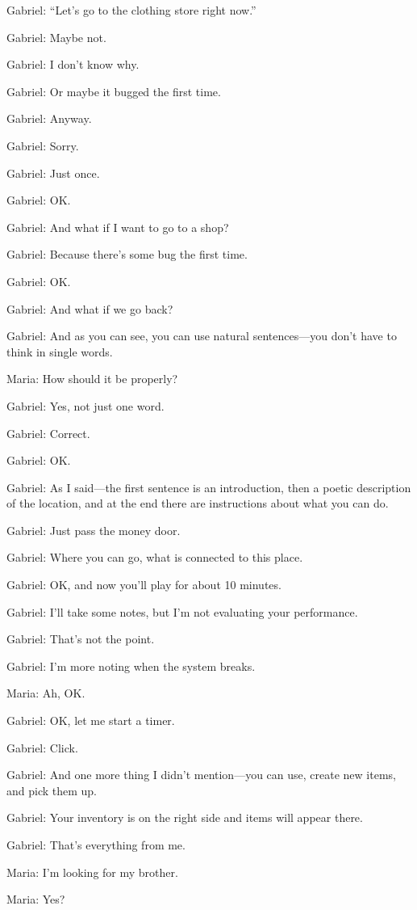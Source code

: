 Gabriel: “Let’s go to the clothing store right now.”

Gabriel: Maybe not.

Gabriel: I don’t know why.

Gabriel: Or maybe it bugged the first time.

Gabriel: Anyway.

Gabriel: Sorry.

Gabriel: Just once.

Gabriel: OK.

Gabriel: And what if I want to go to a shop?

Gabriel: Because there’s some bug the first time.

Gabriel: OK.

Gabriel: And what if we go back?

Gabriel: And as you can see, you can use natural sentences—you don’t have to think in single words.

Maria: How should it be properly?

Gabriel: Yes, not just one word.

Gabriel: Correct.

Gabriel: OK.

Gabriel: As I said—the first sentence is an introduction, then a poetic description of the location, and at the end there are instructions about what you can do.

Gabriel: Just pass the money door.

Gabriel: Where you can go, what is connected to this place.

Gabriel: OK, and now you’ll play for about 10 minutes.

Gabriel: I’ll take some notes, but I’m not evaluating your performance.

Gabriel: That’s not the point.

Gabriel: I’m more noting when the system breaks.

Maria: Ah, OK.

Gabriel: OK, let me start a timer.

Gabriel: Click.

Gabriel: And one more thing I didn’t mention—you can use, create new items, and pick them up.

Gabriel: Your inventory is on the right side and items will appear there.

Gabriel: That’s everything from me.

Maria: I’m looking for my brother.

Maria: Yes?


